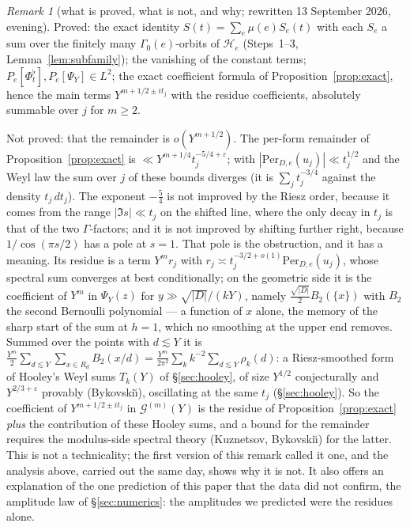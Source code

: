 \documentclass[11pt,a4paper]{article}
\theoremstyle{remark}\newtheorem{remark}[theorem]{Remark}
\begin{document}
\begin{remark}[what is proved, what is not, and why; rewritten 13 September 2026, evening]\label{rem:gaps}
Proved: the exact identity $S(t)=\sum_e\mu(e)S_e(t)$ with each $S_e$ a sum over the finitely many
$\Gamma_0(e)$-orbits of $\mathcal H_e$ (Steps~1--3, Lemma~\ref{lem:subfamily}); the vanishing of the constant terms;
$P_e[\Phi^\flat_t],P_e[\Psi_Y]\in L^2$; the exact coefficient formula of Proposition~\ref{prop:exact}, hence the main
terms $Y^{m+1/2\pm it_j}$ with the residue coefficients, absolutely summable over $j$ for $m\ge2$.

Not proved: that the remainder is $o(Y^{m+1/2})$. The per-form remainder of Proposition~\ref{prop:exact} is
$\ll Y^{m+1/4}t_j^{-5/4+\varepsilon}$; with $|\mathrm{Per}_{D,e}(u_j)|\ll t_j^{1/2}$ and the Weyl law the sum over $j$ of these
bounds diverges (it is $\sum_jt_j^{-3/4}$ against the density $t_j\,dt_j$). The exponent $-\tfrac54$ is not improved by the
Riesz order, because it comes from the range $|\Im s|\ll t_j$ on the shifted line, where the only decay in $t_j$ is that
of the two $\Gamma$-factors; and it is not improved by shifting further right, because $1/\cos(\pi s/2)$ has a pole at
$s=1$. That pole is the obstruction, and it has a meaning. Its residue is a term $Y^m r_j$ with
$r_j\asymp t_j^{-3/2+o(1)}\mathrm{Per}_{D,e}(u_j)$, whose spectral sum converges at best conditionally; on the geometric side
it is the coefficient of $Y^m$ in $\Psi_Y(z)$ for $y\gg\sqrt{|D|}/(kY)$, namely $\tfrac{\sqrt{|D|}}2B_2(\{x\})$ with $B_2$ the
second Bernoulli polynomial --- a function of $x$ alone, the memory of the sharp start of the sum at $h=1$, which no
smoothing at the upper end removes. Summed over the points with $d\lesssim Y$ it is
$\tfrac{Y^m}2\sum_{d\lesssim Y}\sum_{x\in R_d}B_2(x/d)=\tfrac{Y^m}{2\pi^2}\sum_kk^{-2}\sum_{d\lesssim Y}\rho_k(d)$: a Riesz-smoothed
form of Hooley's Weyl sums $T_k(Y)$ of \S\ref{sec:hooley}, of size $Y^{1/2}$ conjecturally and $Y^{2/3+\varepsilon}$
provably (Bykovski\u\i), oscillating at the same $t_j$ (\S\ref{sec:hooley}). So the coefficient of $Y^{m+1/2\pm it_j}$ in
$\mathcal G^{(m)}(Y)$ is the residue of Proposition~\ref{prop:exact} \emph{plus} the contribution of these Hooley sums,
and a bound for the remainder requires the modulus-side spectral theory (Kuznetsov, Bykovski\u\i) for the latter. This
is not a technicality; the first version of this remark called it one, and the analysis above, carried out the same
day, shows why it is not. It also offers an explanation of the one prediction of this paper that the data did not
confirm, the amplitude law of \S\ref{sec:numerics}: the amplitudes we predicted were the residues alone.


\end{remark}
\end{document}
